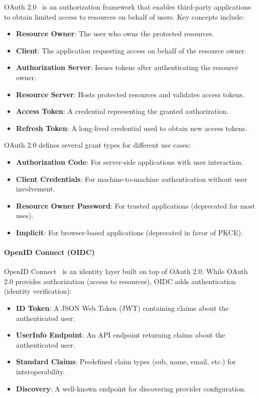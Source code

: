 \documentclass[a4paper,twoside]{sapthesis}
\begin{document}
OAuth 2.0~\cite{rfc6749oauth2}
is an authorization framework that enables third-party applications to obtain limited access to resources on behalf of users. Key concepts include:

\begin{itemize}
    \item \textbf{Resource Owner}: The user who owns the protected resources.
    \item \textbf{Client}: The application requesting access on behalf of the resource owner.
    \item \textbf{Authorization Server}: Issues tokens after authenticating the resource owner.
    \item \textbf{Resource Server}: Hosts protected resources and validates access tokens.
    \item \textbf{Access Token}: A credential representing the granted authorization.
    \item \textbf{Refresh Token}: A long-lived credential used to obtain new access tokens.
\end{itemize}

OAuth 2.0 defines several grant types for different use cases:
\begin{itemize}
    \item \textbf{Authorization Code}: For server-side applications with user interaction.
    \item \textbf{Client Credentials}: For machine-to-machine authentication without user involvement.
    \item \textbf{Resource Owner Password}: For trusted applications (deprecated for most uses).
    \item \textbf{Implicit}: For browser-based applications (deprecated in favor of PKCE).
\end{itemize}

\paragraph{OpenID Connect (OIDC)}

OpenID Connect~\cite{oidc2014}
is an identity layer built on top of OAuth 2.0. While OAuth 2.0 provides authorization (access to resources), OIDC adds authentication (identity verification):

\begin{itemize}
    \item \textbf{ID Token}: A JSON Web Token (JWT) containing claims about the authenticated user.
    \item \textbf{UserInfo Endpoint}: An API endpoint returning claims about the authenticated user.
    \item \textbf{Standard Claims}: Predefined claim types (sub, name, email, etc.) for interoperability.
    \item \textbf{Discovery}: A well-known endpoint for discovering provider configuration.
\end{itemize}
\end{document}
